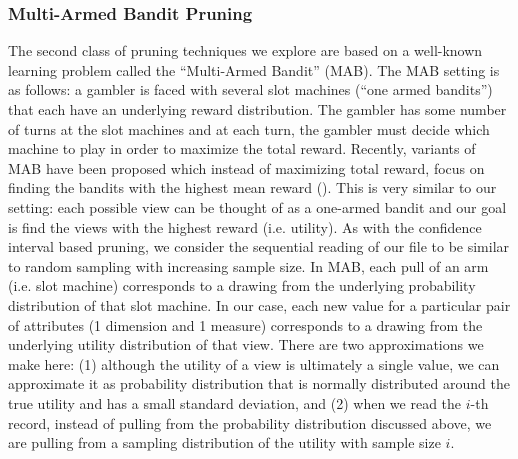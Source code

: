 \subsubsection{Multi-Armed Bandit Pruning}
\label{sec:multi_armed_bandit}
The second class of pruning techniques we explore are based on a
well-known learning problem called the ``Multi-Armed Bandit'' (MAB).
The MAB setting is as follows: a gambler is faced with several slot
machines (``one armed bandits'') that each have an underlying reward
distribution. 
The gambler has some number of turns at the slot machines and at
each turn, the gambler must decide which machine to play in order to maximize
the total reward.
Recently, variants of MAB have been proposed which instead of maximizing total
reward, focus on finding the bandits with the highest
mean reward (\cite{}).
This is very similar to our setting: each possible view can be thought of as a
one-armed bandit and our goal is find the views with the highest reward (i.e.
utility).
As with the confidence interval based pruning, we consider the sequential
reading of our file to be similar to random sampling with increasing sample
size.
In MAB, each pull of an arm (i.e. slot machine) corresponds to a drawing from
the underlying probability distribution of that slot machine.
In our case, each new value for a particular pair of attributes (1 dimension and
1 measure) corresponds to a drawing from the underlying utility distribution
of that view.
There are two approximations we make here: (1) although the utility of a
view is ultimately a single value, we can approximate it as probability
distribution that is normally distributed around the true utility and has a
small standard deviation, and (2) when we read the $i$-th record, instead of
pulling from the probability distribution discussed above, we are pulling from a
sampling distribution of the utility with sample size $i$.

